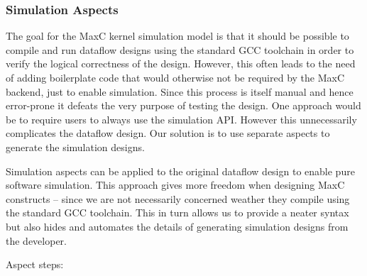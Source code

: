 \subsubsection{Simulation Aspects}

The goal for the MaxC kernel simulation model is that it should be
possible to compile and run dataflow designs using the standard GCC
toolchain in order to verify the logical correctness of the
design. However, this often leads to the need of adding boilerplate
code that would otherwise not be required by the MaxC backend, just to
enable simulation. Since this process is itself manual and hence
error-prone it defeats the very purpose of testing the design. One
approach would be to require users to always use the simulation
API. However this unnecessarily complicates the dataflow design. Our
solution is to use separate aspects to generate the simulation
designs.

Simulation aspects can be applied to the original dataflow design to
enable pure software simulation. This approach gives more freedom when
designing MaxC constructs -- since we are not necessarily concerned
weather they compile using the standard GCC toolchain. This in turn
allows us to provide a neater syntax but also hides and automates the
details of generating simulation designs from the developer.

Aspect steps:

